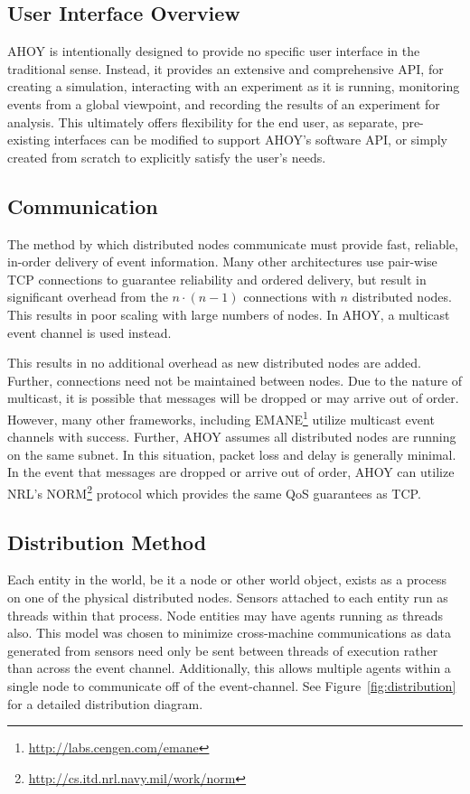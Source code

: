 \documentclass[titlepage]{article}
\begin{document}
\subsection{User Interface Overview}
\label{sec:user_interface}
AHOY is intentionally designed to provide no specific user interface in the traditional sense. Instead, it provides an extensive and comprehensive API, for creating a simulation, interacting with an experiment as it is running, monitoring events from a global viewpoint, and recording the results of an experiment for analysis. This ultimately offers flexibility for the end user, as separate, pre-existing interfaces can be modified to support AHOY's software API, or simply created from scratch to explicitly satisfy the user's needs. 

\subsection{Communication}
The method by which distributed nodes communicate must provide fast, reliable, in-order delivery of event information.  Many other architectures use pair-wise TCP connections to guarantee reliability and ordered delivery, but result in significant overhead from the $n \cdot (n-1)$ connections with $n$ distributed nodes.  This results in poor scaling with large numbers of nodes.  In AHOY, a multicast event channel is used instead.

This results in no additional overhead as new distributed nodes are added.  Further, connections need not be maintained between nodes.  Due to the nature of multicast, it is possible that messages will be dropped or may arrive out of order.  However, many other frameworks, including EMANE\footnote{\url{http://labs.cengen.com/emane}} utilize multicast event channels with success.  Further, AHOY assumes all distributed nodes are running on the same subnet. In this situation, packet loss and delay is generally minimal.  In the event that messages are dropped or arrive out of order, AHOY can utilize NRL's NORM\footnote{\url{http://cs.itd.nrl.navy.mil/work/norm}} protocol which provides the same QoS guarantees as TCP.

\subsection{Distribution Method}
Each entity in the world, be it a node or other world object, exists as a process on one of the physical distributed nodes.  Sensors attached to each entity run as threads within that process.  Node entities may have agents running as threads also.  This model was chosen to minimize cross-machine communications as data generated from sensors need only be sent between threads of execution rather than across the event channel.  Additionally, this allows multiple agents within a single node to communicate off of the event-channel. See Figure~\ref{fig:distribution} for a detailed distribution diagram.
\end{document}
